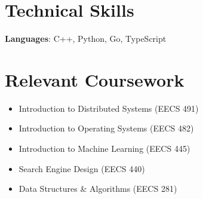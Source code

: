 \documentclass[letterpaper,11pt]{article}
\makeatletter
\newcommand{\resumeItem}[1]{
  \item\small{
    {#1 \vspace{-2pt}}
  }
}
\newcommand{\resumeProjectHeading}[2]{
    \item
    \begin{tabular*}{0.97\textwidth}{l@{\extracolsep{\fill}}r}
      \small#1 & #2 \\
    \end{tabular*}\vspace{-7pt}
}
\newcommand{\resumeSubHeadingListStart}{\begin{itemize}[leftmargin=0.15in, label={}]}
\newcommand{\resumeSubHeadingListEnd}{\end{itemize}}
\newcommand{\resumeItemListStart}{\begin{itemize}}
\newcommand{\resumeItemListEnd}{\end{itemize}\vspace{-5pt}}
\makeatother
\begin{document}

%
\section{Technical Skills}
\begin{itemize}[leftmargin=0.15in, label={}]
  \small{\item{
                \textbf{Languages}{: C++, Python, Go, TypeScript}
          }}
\end{itemize}

%
\section{Relevant Coursework}
\resumeItemListStart{}
\resumeItem{Introduction to Distributed Systems (EECS 491)}
\resumeItem{Introduction to Operating Systems (EECS 482)}
\resumeItem{Introduction to Machine Learning (EECS 445)}
\resumeItem{Search Engine Design (EECS 440)}
\resumeItem{Data Structures \& Algorithms (EECS 281)}
\resumeItemListEnd{}


\end{document}
